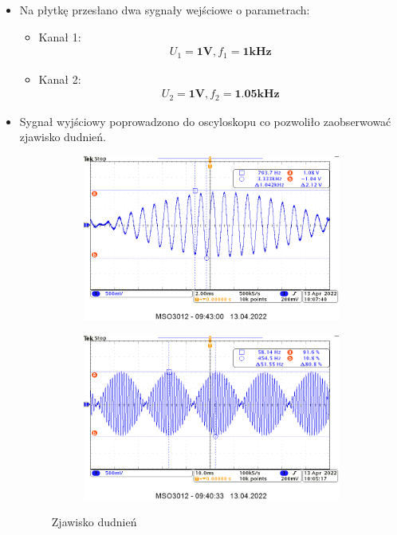 \begin{itemize}
    \item Na płytkę przesłano dwa sygnały wejściowe o parametrach:
        \begin{itemize}
            \item Kanał 1:
                \begin{gather}
                    U_1 = \textbf{1V}, f_1 = \textbf{1kHz}
                \end{gather}
            \item Kanał 2:
                \begin{gather}
                    U_2 = \textbf{1V}, f_2 = \textbf{1.05kHz}
                \end{gather}
        \end{itemize}
    \item Sygnał wyjściowy poprowadzono do oscyloskopu co pozwoliło zaobserwować zjawisko dudnień.
        \begin{figure}[H]
            \centering
            \begin{subfigure}[h]{0.4\textwidth}
                \includegraphics[width=\textwidth]{img/osciloscope/1_3_dudnienia2_cropped.png}
            \end{subfigure}
            \begin{subfigure}[h]{0.4\textwidth}
                \includegraphics[width=\textwidth]{img/osciloscope/1_3_dudnienia_cropped.png}
            \end{subfigure}
            \caption{Zjawisko dudnień}
            \label{sumator:dudnienia}
        \end{figure}
    

\end{itemize}
